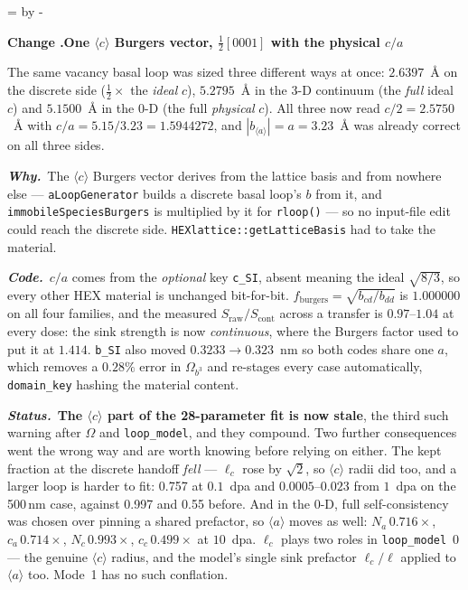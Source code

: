 \documentclass[11pt,a4paper]{article}
\newcommand{\code}[1]{\texttt{\small #1}}
\newcommand{\aloop}{\ensuremath{\langle a\rangle}}
\newcommand{\cloop}{\ensuremath{\langle c\rangle}}
\newcommand{\needlines}[1]{%
  \par\dimen0=\pagegoal \advance\dimen0 by -\pagetotal
  \ifdim\dimen0<#1\baselineskip \newpage \fi}
\newcounter{chg}
\newcommand{\change}[1]{%
  \needlines{4}%
  \refstepcounter{chg}%
  \par\medskip\noindent
  {\bfseries\boldmath Change \thechg.\quad #1}%
  \par\nobreak\smallskip}
\newcommand{\why}[1]{\par\noindent\textbf{\itshape Why.}\ #1\par}
\newcommand{\impact}[1]{\par\noindent\textbf{\itshape Code.}\ #1\par}
\newcommand{\status}[1]{\par\noindent\textbf{\itshape Status.}\ #1\par}
\begin{document}
\change{One \cloop{} Burgers vector, $\frac12[0001]$ with the physical $c/a$}
\label{chg:bc-half}
The same vacancy basal loop was sized three different ways at once: $2.6397$~\AA{}
on the discrete side ($\frac12\times$ the \emph{ideal} $c$), $5.2795$~\AA{} in the
3-D continuum (the \emph{full} ideal $c$) and $5.1500$~\AA{} in the 0-D (the full
\emph{physical} $c$). All three now read $c/2 = 2.5750$~\AA{} with
$c/a = 5.15/3.23 = 1.5944272$, and $|b_{\aloop{}}| = a = 3.23$~\AA{} was already
correct on all three sides.
\why{The \cloop{} Burgers vector derives from the lattice basis and from nowhere
else --- \code{aLoopGenerator} builds a discrete basal loop's $b$ from it, and
\code{immobileSpeciesBurgers} is multiplied by it for \code{rloop()} --- so no
input-file edit could reach the discrete side. \code{HEXlattice::getLatticeBasis}
had to take the material.}
\impact{$c/a$ comes from the \emph{optional} key \code{c\_SI}, absent meaning the
ideal $\sqrt{8/3}$, so every other HEX material is unchanged bit-for-bit.
$f_{\text{burgers}} = \sqrt{b_{cd}/b_{dd}}$ is $1.000000$ on all four families,
and the measured $S_{\text{raw}}/S_{\text{cont}}$ across a transfer is
$0.97$--$1.04$ at every dose: the sink strength is now \emph{continuous}, where
the Burgers factor used to put it at $1.414$. \code{b\_SI} also moved
$0.3233 \to 0.323$~nm so both codes share one $a$, which removes a $0.28\%$ error
in $\Omega_{b^3}$ and re-stages every case automatically, \code{domain\_key}
hashing the material content.}
\status{\textbf{The \cloop{} part of the 28-parameter fit is now stale}, the
third such warning after $\Omega$ and \code{loop\_model}, and they compound.
Two further consequences went the wrong way and are worth knowing before relying
on either. The kept fraction at the discrete handoff \emph{fell} --- $\ell_c$ rose
by $\sqrt2$, so \cloop{} radii did too, and a larger loop is harder to fit: 0.757
at $0.1$~dpa and $0.0005$--$0.023$ from $1$~dpa on the 500\,nm case, against
0.997 and 0.55 before. And in the 0-D, full self-consistency was chosen over
pinning a shared prefactor, so \aloop{} moves as well: $N_a\,0.716\times$,
$c_a\,0.714\times$, $N_c\,0.993\times$, $c_c\,0.499\times$ at $10$~dpa. $\ell_c$
plays two roles in \code{loop\_model}~0 --- the genuine \cloop{} radius, and the
model's single sink prefactor $\ell_c/\ell$ applied to \aloop{} too. Mode~1 has
no such conflation.}
\end{document}
